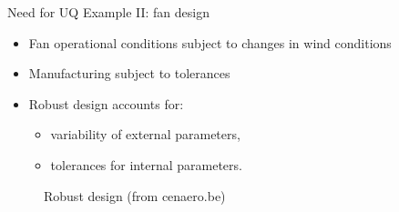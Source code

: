 \documentclass[10pt]{beamer}
\def\vt{\vspace{2mm}}
\def\begit{\begin{itemize}}
\def\endit{\end{itemize}}
\begin{document}

\begin{frame}{Need for UQ} {Example II: fan design}
%
\begit
\item Fan operational conditions subject to changes in wind conditions
\vt
\item Manufacturing subject to tolerances
\vt
\item Robust design accounts for:
  \begit
  \item variability of external parameters,
  \item tolerances for internal parameters.
  \endit
\endit
\begin{figure}[!h]
\begin{center}
\caption{Robust design \scriptsize{(from cenaero.be)}}
\end{center}
\end{figure}
%
\end{frame} 

\end{document}
